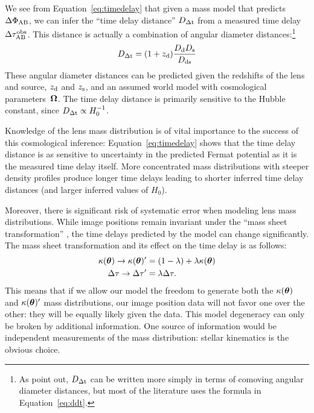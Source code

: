 
We see from Equation~\ref{eq:timedelay} that given a mass
model that predicts $\Delta \Phi_{\rm AB}$, we can infer the ``time
delay distance'' $D_{\Delta{\rm t}}$ from a measured time delay $\Delta \tau_{\rm AB}^{\rm obs}$.
This distance is actually a combination of angular diameter
distances:\footnote{As \citet{SKW06} point out, $D_{\Delta{\rm t}}$ can be written more simply in terms
of comoving angular diameter distances, but most of the literature uses the
formula in Equation~\ref{eq:ddt}.}
\begin{equation}
    D_{\Delta{\rm t}} = (1+z_{\rm d}) \frac{D_{\rm d} D_{\rm s}}{D_{\rm ds}}  \label{eq:ddt}
\end{equation}
These angular diameter distances can be predicted given the redshifts
of the lens and source, $z_{\rm d}$ and $z_{\rm s}$, and an assumed world model with
cosmological parameters~$\boldsymbol{\Omega}$. The time delay distance is primarily
sensitive to the Hubble constant, since $D_{\Delta{\rm t}} \propto H_0^{-1}$.


Knowledge of the lens mass distribution is of vital importance to the
success of this cosmological inference: Equation~\ref{eq:timedelay}
shows  that the time delay  distance is as sensitive to uncertainty in
the predicted Fermat potential as it is the measured time delay itself.
More concentrated mass distributions with steeper density
profiles produce longer time delays leading to shorter inferred time
delay distances (and larger inferred values of $H_0$).


Moreover, there is significant risk of systematic error when modeling
lens mass distributions. While image positions remain invariant under
the ``mass sheet transformation'' \citep{FGS85,S+S13}
\citep[and its generalization, the source-position transformation]{SPT}, the time delays
predicted by the model can change significantly. The mass sheet transformation
and its effect on the time delay is as follows:
\begin{align}
    \kappa(\boldsymbol{\theta}) \rightarrow \kappa(\boldsymbol{\theta})' &= (1 - \lambda) + \lambda \kappa(\boldsymbol{\theta})  \label{eq:mst} \\
    \Delta \tau \rightarrow \Delta \tau' &= \lambda \Delta \tau.
\end{align}
This means that if we allow our model the freedom to generate both the
$\kappa(\boldsymbol{\theta})$ and $\kappa(\boldsymbol{\theta})'$ mass distributions, our image position
data will not favor one over the other: they will be equally likely
given the data. This model degeneracy can only be broken by additional
information. One source of information would be independent measurements
of the mass distribution: stellar kinematics is the obvious choice.

